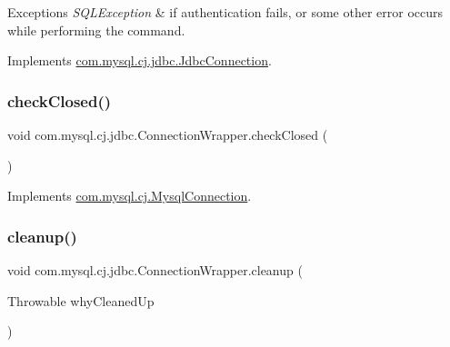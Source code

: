 \begin{DoxyExceptions}{Exceptions}
{\em S\+Q\+L\+Exception} & if authentication fails, or some other error occurs while performing the command. \\
\hline
\end{DoxyExceptions}


Implements \mbox{\hyperlink{interfacecom_1_1mysql_1_1cj_1_1jdbc_1_1_jdbc_connection_aed0496e0f2c1236f2784f92b45a482ef}{com.\+mysql.\+cj.\+jdbc.\+Jdbc\+Connection}}.

\mbox{\label{classcom_1_1mysql_1_1cj_1_1jdbc_1_1_connection_wrapper_a071813afb9b56c08fa663b1d429c8def}} 
\subsubsection{\texorpdfstring{check\+Closed()}{checkClosed()}}
{\footnotesize\ttfamily void com.\+mysql.\+cj.\+jdbc.\+Connection\+Wrapper.\+check\+Closed (\begin{DoxyParamCaption}{ }\end{DoxyParamCaption})}



Implements \mbox{\hyperlink{interfacecom_1_1mysql_1_1cj_1_1_mysql_connection_a49756db5417b86971e0f2bb17ae71630}{com.\+mysql.\+cj.\+Mysql\+Connection}}.

\mbox{\label{classcom_1_1mysql_1_1cj_1_1jdbc_1_1_connection_wrapper_ab604be7f74e54251056bc902359fa65a}} 
\subsubsection{\texorpdfstring{cleanup()}{cleanup()}}
{\footnotesize\ttfamily void com.\+mysql.\+cj.\+jdbc.\+Connection\+Wrapper.\+cleanup (\begin{DoxyParamCaption}\item[{Throwable}]{why\+Cleaned\+Up }\end{DoxyParamCaption})}



